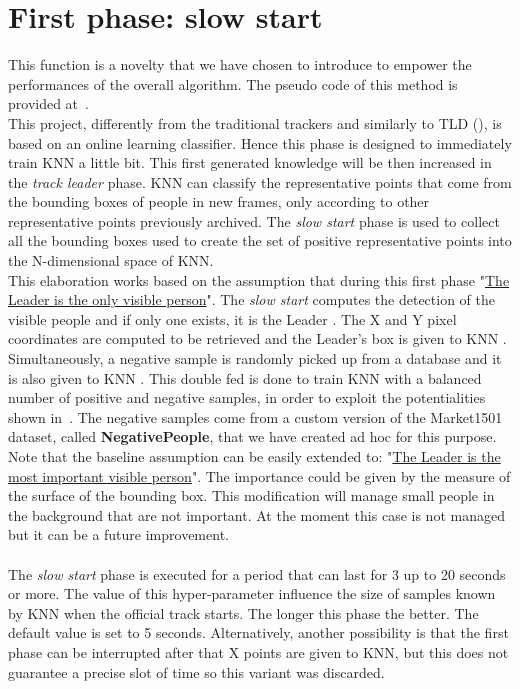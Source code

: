 \section{First phase: slow start} \label{sec:slowStartPhase}
This function is a novelty that we have chosen to introduce to empower the performances of the overall algorithm. The pseudo code of this method is provided at~.\\
This project, differently from the traditional trackers and similarly to TLD (), is based on an online learning classifier. Hence this phase is designed to immediately train KNN a little bit. This first generated knowledge will be then increased in the \textit{track leader} phase. KNN can classify the representative points that come from the bounding boxes of people in new frames, only according to other representative points previously archived. The \textit{slow start} phase is used to collect all the bounding boxes used to create the set of positive representative points into the N-dimensional space of KNN.\\
This elaboration works based on the assumption that during this first phase "\ul{The Leader is the only visible person}". The \textit{slow start} computes the detection of the visible people  and if only one exists, it is the Leader . The X and Y pixel coordinates are computed to be retrieved  and the Leader's box is given to KNN . Simultaneously, a negative sample is randomly picked up from a database and it is also given to KNN . This double fed is done to train KNN with a balanced number of positive and negative samples, in order to exploit the potentialities shown in~. The negative samples come from a custom version of the Market1501 dataset\cite{market1501}, called \textbf{NegativePeople}, that we have created ad hoc for this purpose.\\
Note that the baseline assumption can be easily extended to: "\ul{The Leader is the most important visible person}". The importance could be given by the measure of the surface of the bounding box. This modification will manage small people in the background that are not important. At the moment this case is not managed  but it can be a future improvement.\\
\\
The \textit{slow start} phase is executed for a period that can last for 3 up to 20 seconds or more. The value of this hyper-parameter influence the size of samples known by KNN when the official track starts. The longer this phase the better. The default value is set to 5 seconds. Alternatively, another possibility is that the first phase can be interrupted after that X points are given to KNN, but this does not guarantee a precise slot of time so this variant was discarded.

